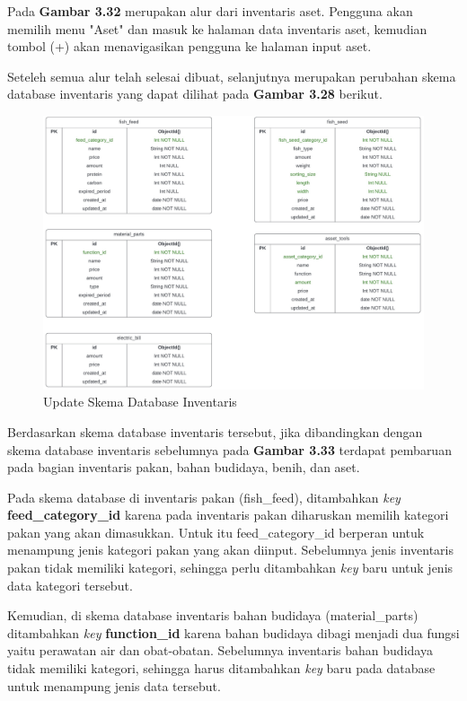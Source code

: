 \begin{enumerate}
\begin{enumerate}
		Pada \textbf{Gambar 3.32} merupakan alur dari inventaris aset. Pengguna akan memilih menu "Aset" dan masuk ke halaman data inventaris aset, kemudian tombol (+) akan menavigasikan pengguna ke halaman input aset.

		Seteleh semua alur telah selesai dibuat, selanjutnya merupakan perubahan skema database inventaris yang dapat dilihat pada \textbf{Gambar 3.28} berikut.

		\begin{figure}[H]
			\centering
			\includegraphics[width=1\textwidth]{gambar/sprint2/inventory_schema.jpeg}
			\caption{Update Skema Database Inventaris}
		\end{figure}

		Berdasarkan skema database inventaris tersebut, jika dibandingkan dengan skema database inventaris sebelumnya pada \textbf{Gambar 3.33} terdapat pembaruan pada bagian inventaris pakan, bahan budidaya, benih, dan aset.

		Pada skema database di inventaris pakan (fish\_feed), ditambahkan \textit{key} \textbf{feed\_category\_id} karena pada inventaris pakan diharuskan memilih kategori pakan yang akan dimasukkan. Untuk itu feed\_category\_id berperan untuk menampung jenis kategori pakan yang akan diinput. Sebelumnya jenis inventaris pakan tidak memiliki kategori, sehingga perlu ditambahkan \textit{key} baru untuk jenis data kategori tersebut.

		Kemudian, di skema database inventaris bahan budidaya (material\_parts) ditambahkan \textit{key} \textbf{function\_id} karena bahan budidaya dibagi menjadi dua fungsi yaitu perawatan air dan obat-obatan. Sebelumnya inventaris bahan budidaya tidak memiliki kategori, sehingga harus ditambahkan \textit{key} baru pada database untuk menampung jenis data tersebut.


\end{enumerate}
\end{enumerate}
